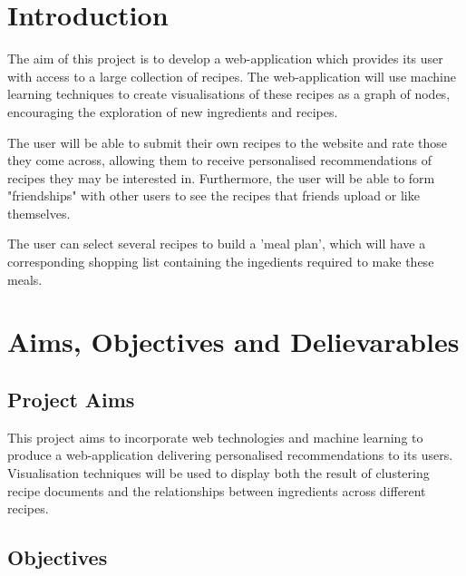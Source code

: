 %
%
\section{Introduction}

The aim of this project is to develop a web-application which provides its user with access to a large collection of recipes. The web-application will use machine learning techniques to create visualisations of these recipes as a graph of nodes, encouraging the exploration of new ingredients and recipes.

The user will be able to submit their own recipes to the website and rate those they come across, allowing them to receive personalised recommendations of recipes they may be interested in. Furthermore, the user will be able to form "friendships" with other users to see the recipes that friends upload or like themselves.

The user can select several recipes to build a 'meal plan', which will have a corresponding shopping list containing the ingedients required to make these meals. 

%
%
\section{Aims, Objectives and Delievarables}

\subsection{Project Aims}

This project aims to incorporate web technologies and machine learning to produce a web-application delivering personalised recommendations to its users. 
Visualisation techniques will be used to display both the result of clustering recipe documents and the relationships between ingredients across different recipes.
\subsection{Objectives}


